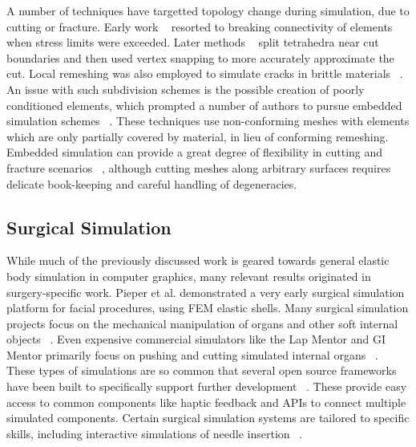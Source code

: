 A number of techniques have targetted topology change during
simulation, due to cutting or fracture. Early work ~\citep{TerzoF:1988b}
resorted to breaking connectivity of elements when stress limits were
exceeded. Later methods ~\citep{NienhS:2001} split tetrahedra near cut
boundaries and then used vertex snapping to more accurately
approximate the cut. Local remeshing was also employed to simulate
cracks in brittle materials ~\citep{OBriH:1999}. An issue with such
subdivision schemes is the possible creation of poorly conditioned
elements, which prompted a number of authors to pursue embedded
simulation schemes ~\citep{MolinBF:2004,TeranSBNLF:2005}. These
techniques use non-conforming meshes with elements which are only
partially covered by material, in lieu of conforming
remeshing. Embedded simulation can provide a great degree of
flexibility in cutting and fracture scenarios ~\citep{SifakDF:2007},
although cutting meshes along arbitrary surfaces requires delicate
book-keeping and careful handling of degeneracies.


\subsection{Surgical Simulation}
While much of the previously discussed work is geared towards general
elastic body simulation in computer graphics, many relevant results
originated in surgery-specific work. Pieper et al.\!
 demonstrated a very early surgical simulation
platform for facial procedures, using FEM elastic shells.  Many
surgical simulation projects focus on the mechanical manipulation of
organs and other soft internal objects
~\citep{NienhS:2001,KimCDS:2007}. Even expensive commercial simulators
like the Lap Mentor and GI Mentor primarily focus on pushing and
cutting simulated internal organs
~\citep{SUSAC:2002--2014b,SUSAC:2002--2014}. These types of simulations
are so common that several open source frameworks have been built to
specifically support further development
~\citep{AllarCFBPDDGo:2007,CavusGT:2006}. These provide easy access to
common components like haptic feedback and APIs to connect multiple
simulated components. Certain surgical simulation systems are tailored
to specific skills, including interactive simulations of needle
insertion ~\citep{ChentARCHGSO:2009}.

